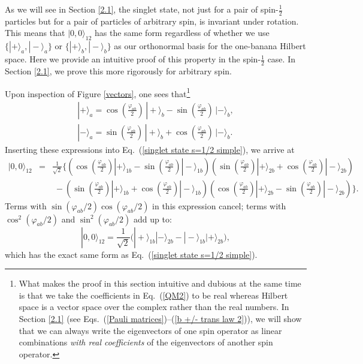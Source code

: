 As we will see in Section \ref{2.1}, the singlet state, not just for a pair of spin-$\frac12$ particles but for a  pair of particles of arbitrary spin, is invariant under rotation. This means that $|0, 0 \rangle_{12}$ has the same form regardless of whether we use $\{ |+ \rangle_a, |- \rangle_a \}$ or $\{ |+ \rangle_b, |- \rangle_b \}$ as our orthonormal basis for the one-banana Hilbert space. Here we provide an intuitive proof of this property in the spin-$\frac12$ case. In Section \ref{2.1}, we prove this more rigorously for arbitrary spin.

Upon inspection of Figure \ref{vectors}, one sees that\footnote{What makes the proof in this section intuitive and dubious at the same time is that we take the coefficients in Eq.\ (\ref{QM2}) to be real whereas Hilbert space is a vector space over the complex rather than the real numbers. In Section \ref{2.1} (see Eqs.\ (\ref{Pauli matrices})--(\ref{b +/- trans law 2})), we will show that we can always write the eigenvectors of one spin operator as linear combinations \emph{with real coefficients} of the eigenvectors of another spin operator.}
\begin{equation}
\begin{array}{c}
|+ \rangle_a = \cos{\! \left( {\displaystyle \frac{\varphi_{ab}}{2}} \right)} \, |+ \rangle_b - \sin{\! \left( {\displaystyle \frac{\varphi_{ab}}{2}} \right)} \, |- \rangle_b, \\[.6cm]
|- \rangle_a = \sin{\! \left( {\displaystyle \frac{\varphi_{ab}}{2}} \right)} \, |+ \rangle_b + \cos{\! \left( {\displaystyle \frac{\varphi_{ab}}{2}} \right)} \, |- \rangle_b.
\end{array}
\label{QM2}
\end{equation}
Inserting these expressions into Eq.\ (\ref{singlet state s=1/2 simple}), we arrive at
\begin{eqnarray}
|0, 0 \rangle_{12} & \! \!\! = \! \!\! & \frac{1}{\sqrt{2}} \Big\{ \! \left(  \cos{\! \left( \frac{\varphi_{ab}}{2} \right)}  |+ \rangle_{1b} - \sin{\! \left(  \frac{\varphi_{ab}}{2} \right)} |- \rangle_{1b} \! \right) 
\!\! \left(  \sin{\! \left(  \frac{\varphi_{ab}}{2}  \right)} |+ \rangle_{2b} + \cos{\! \left(  \frac{\varphi_{ab}}{2} \right)} |- \rangle_{2b} \!  \right) 
 \nonumber \\[.3cm]
  &  & \; - \left( \sin{\! \left(  \frac{\varphi_{ab}}{2}  \right)}  |+ \rangle_{1b} + \cos{\! \left(  \frac{\varphi_{ab}}{2}  \right)} |- \rangle_{1b} \right) 
 \!\! \left( \cos{\! \left(  \frac{\varphi_{ab}}{2}  \right)} |+ \rangle_{2b} - \sin{\! \left(  \frac{\varphi_{ab}}{2}  \right)} |- \rangle_{2b}  \right) \! \Big\}.  
 \nonumber
 \end{eqnarray}
Terms with $\sin{\!\left( \varphi_{ab}/{2} \right)} \cos{\!\left( \varphi_{ab}/{2} \right)}$ in this expression cancel; terms with $\cos^2{\!\left( \varphi_{ab}/{2} \right)}$ and $\sin^2{\!\left( \varphi_{ab}/{2} \right)}$ add up to:
\begin{equation}
|0, 0 \rangle_{12} = \frac{1}{\sqrt{2}} \Big( |+ \rangle_{1b} |- \rangle_{2b}  - |-  \rangle_{1b} | + \rangle_{2b} \Big), 
\label{QM3}
\end{equation}
 which has the exact same form as Eq.\ (\ref{singlet state s=1/2 simple}).   

